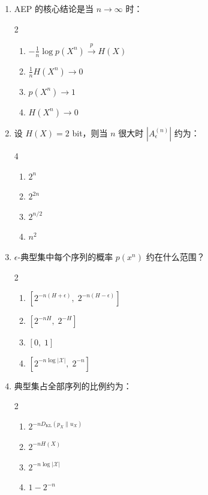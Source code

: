 \documentclass[12pt,a4paper]{ctexart}
\newcommand{\XX}{\mathcal{X}}
\newcommand{\DKL}{D_{\mathrm{KL}}}
\begin{document}
\begin{enumerate}[label=\arabic*., leftmargin=*]

\item AEP 的核心结论是当 $n \to \infty$ 时：
\begin{multicols}{2}
\begin{enumerate}[label=(\Alph*)]
  \item $-\frac{1}{n}\log p(X^n) \xrightarrow{p} H(X)$
  \item $\frac{1}{n}H(X^n) \to 0$
  \item $p(X^n) \to 1$
  \item $H(X^n) \to 0$
\end{enumerate}
\end{multicols}

\item 设 $H(X) = 2$ bit，则当 $n$ 很大时 $|A_\epsilon^{(n)}|$ 约为：
\begin{multicols}{4}
\begin{enumerate}[label=(\Alph*)]
  \item $2^n$
  \item $2^{2n}$
  \item $2^{n/2}$
  \item $n^2$
\end{enumerate}
\end{multicols}

\item $\epsilon$-典型集中每个序列的概率 $p(x^n)$ 约在什么范围？
\begin{multicols}{2}
\begin{enumerate}[label=(\Alph*)]
  \item $[2^{-n(H+\epsilon)},\; 2^{-n(H-\epsilon)}]$
  \item $[2^{-nH},\; 2^{-H}]$
  \item $[0,\; 1]$
  \item $[2^{-n\log|\XX|},\; 2^{-n}]$
\end{enumerate}
\end{multicols}

\item 典型集占全部序列的比例约为：
\begin{multicols}{2}
\begin{enumerate}[label=(\Alph*)]
  \item $2^{-n\DKL(p_X\|u_X)}$
  \item $2^{-nH(X)}$
  \item $2^{-n\log|\XX|}$
  \item $1 - 2^{-n}$
\end{enumerate}
\end{multicols}


\end{enumerate}
\end{document}
